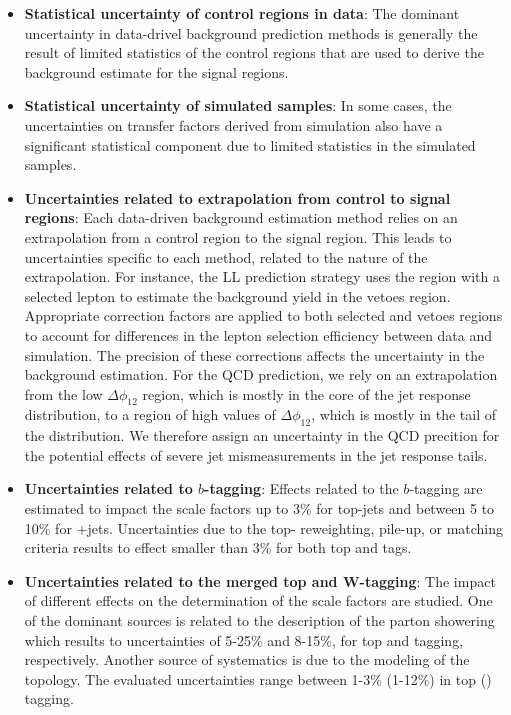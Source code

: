 \begin{itemize}
	\item \textbf{Statistical uncertainty of control regions in data}: The dominant uncertainty in data-drivel background prediction methods is generally the result of limited statistics of the control regions that are used to derive the background estimate for the signal regions.
	\item \textbf{Statistical uncertainty of simulated samples}: In some cases, the uncertainties on transfer factors derived from simulation also have a significant statistical component due to limited statistics in the simulated samples.
	\item \textbf{Uncertainties related to extrapolation from control to signal regions}: Each data-driven background estimation method relies on an extrapolation from a control region to the signal region. This leads to uncertainties specific to each method, related to the nature of the extrapolation. For instance, the LL prediction strategy uses the region with a selected lepton to estimate the background yield in the vetoes region. Appropriate correction factors are applied to both selected and vetoes regions to account for differences in the lepton selection efficiency between data and simulation. The precision of these corrections affects the uncertainty in the background estimation. For the QCD prediction, we rely on an extrapolation from the low $\Delta\phi_{12}$ region, which is mostly in the core of the jet response distribution, to a region of high values of $\Delta\phi_{12}$, which is mostly in the tail of the distribution. We therefore assign an uncertainty in the QCD precition for the potential effects of severe jet mismeasurements in the jet response tails. 
	\item \textbf{Uncertainties related to $b$-tagging}: Effects related to the $b$-tagging are estimated to impact the scale factors up to 3\% for top-jets and between 5 to 10\% for \W+jets. Uncertainties due to the top-\pt{} reweighting, pile-up, or matching criteria results to effect smaller than 3\% for both top and \W{} tags. 
	\item \textbf{Uncertainties related to the merged top and W-tagging}: The impact of different effects on the determination of the scale factors are studied. One of the dominant sources is related to the description of the parton showering which results to uncertainties of 5-25\% and 8-15\%, for top and \W{} tagging, respectively. Another source of systematics is due to the modeling of the \ttbar{} topology. The evaluated uncertainties range between 1-3\% (1-12\%) in top (\W) tagging. 

\end{itemize}
